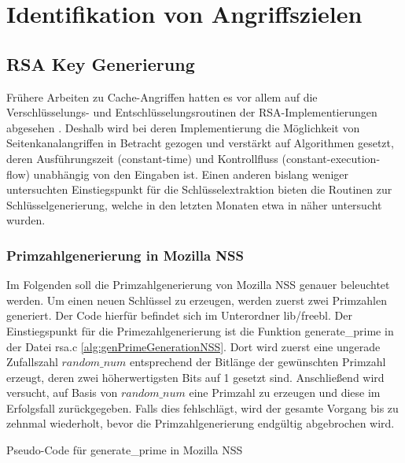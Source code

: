 \chapter{Identifikation von Angriffszielen}
\label{chapter:results}

\section{RSA Key Generierung}

Frühere Arbeiten zu Cache-Angriffen hatten es vor allem auf die Verschlüsselungs- und Entschlüsselungsroutinen der RSA-Implementierungen abgesehen \cite{FlushReload, CacheBleedOpenSSLRSA}.
Deshalb wird bei deren Implementierung die Möglichkeit von Seitenkanalangriffen in Betracht gezogen und verstärkt auf Algorithmen gesetzt, deren Ausführungszeit (constant-time) und Kontrollfluss (constant-execution-flow) unabhängig von den Eingaben ist.
Einen anderen bislang weniger untersuchten Einstiegspunkt für die Schlüsselextraktion bieten die Routinen zur Schlüsselgenerierung, welche in den letzten Monaten etwa in \cite{RSAKeyGeneration2} näher untersucht wurden.

\subsection{Primzahlgenerierung in Mozilla NSS}

Im Folgenden soll die Primzahlgenerierung von Mozilla NSS genauer beleuchtet werden.
Um einen neuen Schlüssel zu erzeugen, werden zuerst zwei Primzahlen generiert. 
Der Code hierfür befindet sich im Unterordner lib/freebl.
Der Einstiegspunkt für die Primezahlgenerierung ist die Funktion generate_prime in der Datei rsa.c \ref{alg:genPrimeGenerationNSS}.
Dort wird zuerst eine ungerade Zufallszahl $random\_num$ entsprechend der Bitlänge der gewünschten Primzahl erzeugt, deren zwei höherwertigsten Bits auf 1 gesetzt sind.
Anschließend wird versucht, auf Basis von $random\_num$ eine Primzahl zu erzeugen und diese im Erfolgsfall zurückgegeben.
Falls dies fehlschlägt, wird der gesamte Vorgang bis zu zehnmal wiederholt, bevor die Primzahlgenerierung endgültig abgebrochen wird.

\begin{algorithm}[h]
\DontPrintSemicolon
\caption{Pseudo-Code für generate_prime in Mozilla NSS}
\label{alg:genPrimeGenerationNSS}

\end{algorithm}

